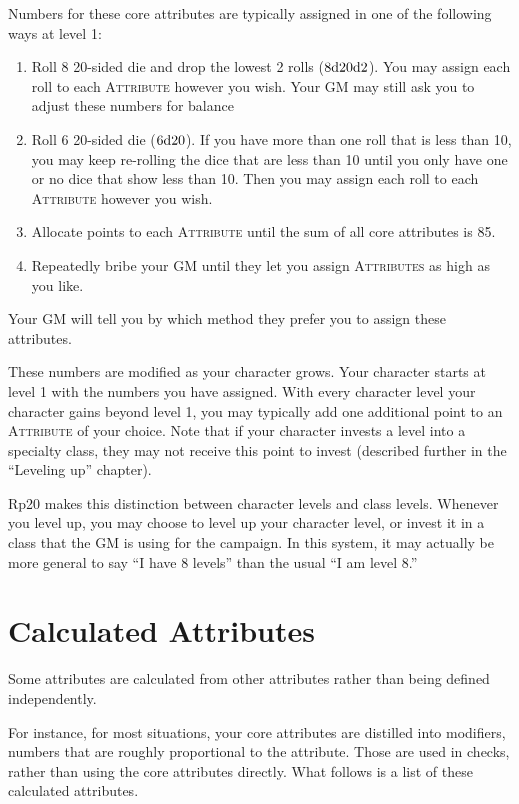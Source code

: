 Numbers for these core attributes are typically assigned in one of the following ways at level 1:
\begin{enumerate}
\item Roll 8 20-sided die and drop the lowest 2 rolls ($8\mathrm{d}20\mathrm{d}2$). You may assign each roll to each \textsc{Attribute} however you wish. Your GM may still ask you to adjust these numbers for balance
\item Roll 6 20-sided die ($6\mathrm{d}20$). If you have more than one roll that is less than 10, you may keep re-rolling the dice that are less than 10 until you only have one or no dice that show less than 10. Then you may assign each roll to each \textsc{Attribute} however you wish.
\item Allocate points to each \textsc{Attribute} until the sum of all core attributes is 85.
\item Repeatedly bribe your GM until they let you assign \textsc{Attributes} as high as you like.
\end{enumerate}

Your GM will tell you by which method they prefer you to assign these attributes.

These numbers are modified as your character grows. Your character starts at level 1 with the numbers you have assigned. With every character level your character gains beyond level 1, you may typically add one additional point to an \textsc{Attribute} of your choice. Note that if your character invests a level into a specialty class, they may not receive this point to invest (described further in the ``Leveling up'' chapter).

Rp20 makes this distinction between character levels and class levels. Whenever you level up, you may choose to level up your character level, or invest it in a class that the GM is using for the campaign. In this system, it may actually be more general to say ``I have 8 levels'' than the usual ``I am level 8.''

\section{Calculated Attributes}
Some attributes are calculated from other attributes rather than being defined independently. 

For instance, for most situations, your core attributes are distilled into modifiers, numbers that are roughly proportional to the attribute. Those are used in checks, rather than using the core attributes directly. What follows is a list of these calculated attributes.

